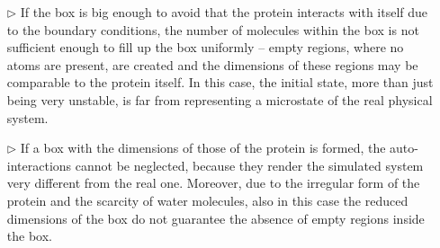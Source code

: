 \begin{itemize}
\item[$\triangleright$] If the box is big enough to avoid that the protein interacts with itself due to the boundary conditions, the number of molecules within the box is not sufficient enough to fill up the box uniformly – empty regions, where no atoms are present, are created and the dimensions of these regions may be comparable to the protein itself. In this case, the initial state, more than just being very unstable, is far from representing a microstate of the real physical system.
\item[$\triangleright$] If a box with the dimensions of those of the protein is formed, the auto-interactions cannot be neglected, because they render the simulated system very different from the real one. Moreover, due to the irregular form of the protein and the scarcity of water molecules, also in this case the reduced dimensions of the box do not guarantee the absence of empty regions inside the box.
\end{itemize} 

